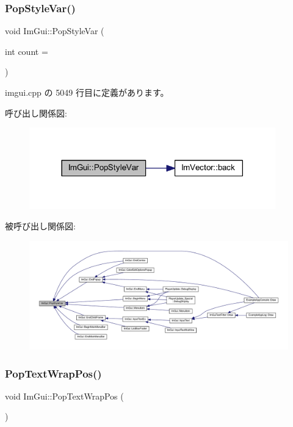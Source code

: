 \subsubsection{\texorpdfstring{Pop\+Style\+Var()}{PopStyleVar()}}
{\footnotesize\ttfamily void Im\+Gui\+::\+Pop\+Style\+Var (\begin{DoxyParamCaption}\item[{int}]{count = {} }\end{DoxyParamCaption})}



 imgui.\+cpp の 5049 行目に定義があります。

呼び出し関係図\+:\nopagebreak
\begin{figure}[H]
\begin{center}
\leavevmode
\includegraphics[width=302pt]{namespace_im_gui_a14116e57d81e326adef2a702e65781d4_cgraph}
\end{center}
\end{figure}
被呼び出し関係図\+:\nopagebreak
\begin{figure}[H]
\begin{center}
\leavevmode
\includegraphics[width=350pt]{namespace_im_gui_a14116e57d81e326adef2a702e65781d4_icgraph}
\end{center}
\end{figure}
\mbox{\label{namespace_im_gui_a08000421b9cc13757430efe54178ae0f}} 
\subsubsection{\texorpdfstring{Pop\+Text\+Wrap\+Pos()}{PopTextWrapPos()}}
{\footnotesize\ttfamily void Im\+Gui\+::\+Pop\+Text\+Wrap\+Pos (\begin{DoxyParamCaption}{ }\end{DoxyParamCaption})}



